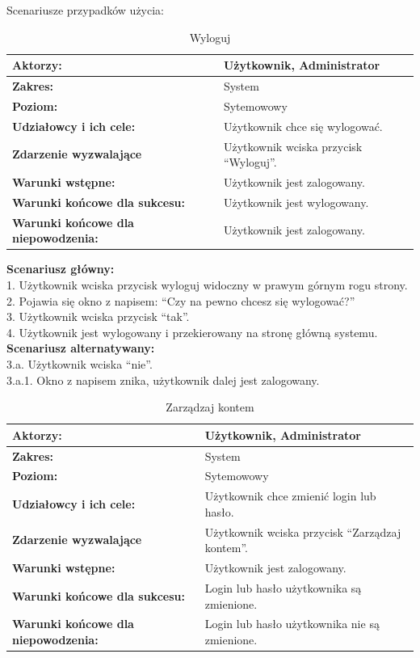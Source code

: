 Scenariusze przypadków użycia:
\begin{table}[h]
\centering
\caption{Wyloguj}
\label{wyloguj}
\begin{tabular}{|p{7cm}|p{7cm}|}
  \hline 
  \textbf{Aktorzy:} & Użytkownik, Administrator\\
  \hline
  \textbf{Zakres:} & System \\
	\hline
  \textbf{Poziom:} & Sytemowowy \\
	\hline
  \textbf{Udziałowcy i ich cele: } & Użytkownik chce się wylogować. \\
	\hline
  \textbf{Zdarzenie wyzwalające } & Użytkownik wciska przycisk “Wyloguj”. \\
	\hline
  \textbf{Warunki wstępne: } & Użytkownik jest zalogowany.
 \\
	\hline
  \textbf{Warunki końcowe dla sukcesu:} & Użytkownik jest wylogowany.
 \\
	\hline
  \textbf{Warunki końcowe dla niepowodzenia:} & Użytkownik jest zalogowany. \\
  \hline
\end{tabular} 
\end{table}
\newpage
\textbf{Scenariusz główny:} \\
1. Użytkownik wciska przycisk wyloguj widoczny w prawym górnym rogu strony. \\
2. Pojawia się okno z napisem: “Czy na pewno chcesz się wylogować?” \\
3. Użytkownik wciska przycisk “tak”. \\
4. Użytkownik jest wylogowany i przekierowany na stronę główną systemu. \\
\textbf{Scenariusz alternatywany: \\
} 
3.a. Użytkownik wciska “nie”. \\
3.a.1. Okno z napisem znika, użytkownik dalej jest zalogowany. \\

\begin{table}[h]
\centering
\caption{Zarządzaj kontem}
\label{zarzadzajkontem}
\begin{tabular}{|p{7cm}|p{7cm}|}
  \hline 
  \textbf{Aktorzy:} & Użytkownik, Administrator\\
  \hline
  \textbf{Zakres:} & System \\
	\hline
  \textbf{Poziom:} & Sytemowowy \\
	\hline
  \textbf{Udziałowcy i ich cele: } & Użytkownik chce zmienić login lub hasło. \\
	\hline
  \textbf{Zdarzenie wyzwalające } & Użytkownik wciska przycisk “Zarządzaj kontem”. \\
	\hline
  \textbf{Warunki wstępne: } & Użytkownik jest zalogowany.\\
	\hline
  \textbf{Warunki końcowe dla sukcesu:} & Login lub hasło użytkownika są zmienione.\\
	\hline
  \textbf{Warunki końcowe dla niepowodzenia:} & Login lub hasło użytkownika nie są zmienione. \\
  \hline
\end{tabular} 
\end{table}

